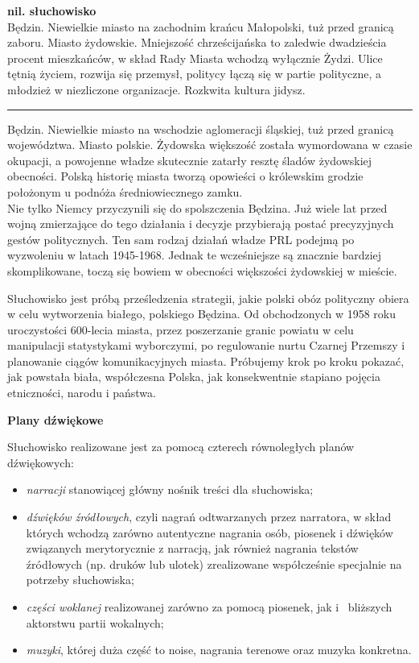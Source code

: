 \documentclass[11pt,a4paper,oneside]{article}
\begin{document}
\textbf{nil. słuchowisko}
\\

Będzin. Niewielkie miasto na zachodnim krańcu Małopolski, tuż przed
granicą zaboru. Miasto żydowskie. Mniejszość chrześcijańska to zaledwie
dwadzieścia procent mieszkańców, w skład Rady Miasta wchodzą wyłącznie
Żydzi. Ulice tętnią życiem, rozwija się przemysł, politycy łączą się w
partie polityczne, a młodzież w niezliczone organizacje. Rozkwita
kultura jidysz.

\begin{center}\rule{3in}{0.4pt}\end{center}

Będzin. Niewielkie miasto na wschodzie aglomeracji śląskiej, tuż przed
granicą województwa. Miasto polskie. Żydowska większość została
wymordowana w czasie okupacji, a powojenne władze skutecznie zatarły
resztę śladów żydowskiej obecności. Polską historię miasta tworzą
opowieści o królewskim grodzie położonym u podnóża średniowiecznego
zamku.
\\

Nie tylko Niemcy przyczynili się do spolszczenia Będzina. Już wiele lat
przed wojną zmierzające do tego działania i decyzje przybierają postać
precyzyjnych gestów politycznych. Ten sam rodzaj działań władze PRL
podejmą po wyzwoleniu w latach 1945-1968. Jednak te wcześniejsze są
znacznie bardziej skomplikowane, toczą się bowiem w obecności większości
żydowskiej w mieście.

\hspace{1em}Słuchowisko jest próbą prześledzenia strategii, jakie polski obóz
polityczny obiera w celu wytworzenia białego, polskiego Będzina. Od
obchodzonych w 1958 roku uroczystości 600-lecia miasta, przez
poszerzanie granic powiatu w celu manipulacji statystykami wyborczymi,
po regulowanie nurtu Czarnej Przemszy i planowanie ciągów
komunikacyjnych miasta. Próbujemy krok po kroku pokazać, jak powstała
biała, współczesna Polska, jak konsekwentnie stapiano pojęcia
etniczności, narodu i państwa.


\pagebreak
\textbf{Plany dźwiękowe}

Słuchowisko realizowane jest za pomocą czterech równoległych planów
dźwiękowych:

\begin{itemize}
\item
  \emph{narracji} stanowiącej główny nośnik treści dla słuchowiska;
\item
  \emph{dźwięków źródłowych}, czyli nagrań odtwarzanych przez narratora,
  w skład których wchodzą zarówno autentyczne nagrania osób, piosenek i
  dźwięków związanych merytorycznie z narracją, jak również nagrania
  tekstów źródłowych (np. druków lub ulotek) zrealizowane współcześnie
  specjalnie na potrzeby słuchowiska;
\item
  \emph{części woklanej} realizowanej zarówno za pomocą piosenek, jak i~
  bliższych aktorstwu partii wokalnych;
\item
  \emph{muzyki}, której duża część to noise, nagrania terenowe oraz
  muzyka konkretna.
\end{itemize}
\end{document}
